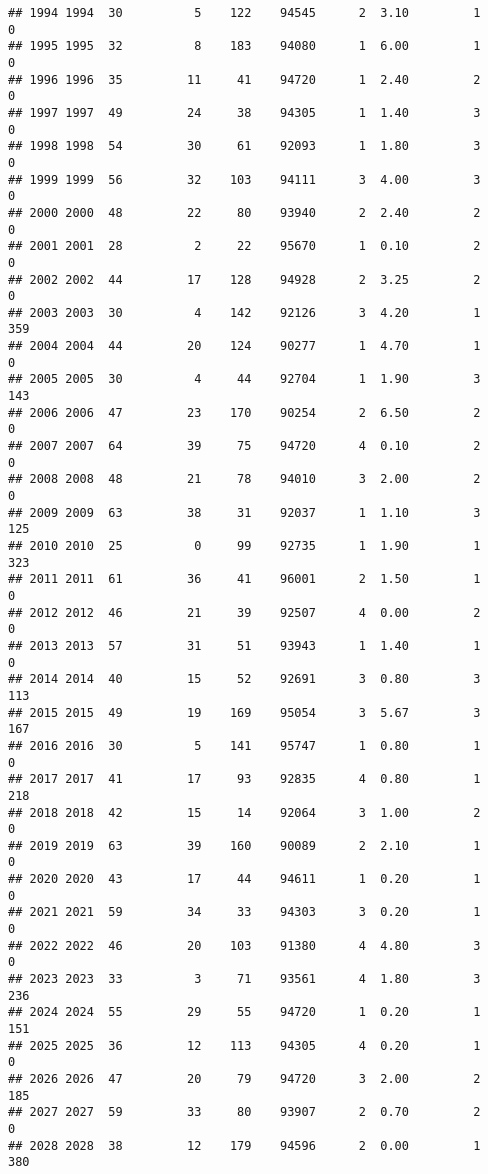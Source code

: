 \documentclass[
]{article}
\begin{document}
\begin{verbatim}
## 1994 1994  30          5    122    94545      2  3.10         1        0
## 1995 1995  32          8    183    94080      1  6.00         1        0
## 1996 1996  35         11     41    94720      1  2.40         2        0
## 1997 1997  49         24     38    94305      1  1.40         3        0
## 1998 1998  54         30     61    92093      1  1.80         3        0
## 1999 1999  56         32    103    94111      3  4.00         3        0
## 2000 2000  48         22     80    93940      2  2.40         2        0
## 2001 2001  28          2     22    95670      1  0.10         2        0
## 2002 2002  44         17    128    94928      2  3.25         2        0
## 2003 2003  30          4    142    92126      3  4.20         1      359
## 2004 2004  44         20    124    90277      1  4.70         1        0
## 2005 2005  30          4     44    92704      1  1.90         3      143
## 2006 2006  47         23    170    90254      2  6.50         2        0
## 2007 2007  64         39     75    94720      4  0.10         2        0
## 2008 2008  48         21     78    94010      3  2.00         2        0
## 2009 2009  63         38     31    92037      1  1.10         3      125
## 2010 2010  25          0     99    92735      1  1.90         1      323
## 2011 2011  61         36     41    96001      2  1.50         1        0
## 2012 2012  46         21     39    92507      4  0.00         2        0
## 2013 2013  57         31     51    93943      1  1.40         1        0
## 2014 2014  40         15     52    92691      3  0.80         3      113
## 2015 2015  49         19    169    95054      3  5.67         3      167
## 2016 2016  30          5    141    95747      1  0.80         1        0
## 2017 2017  41         17     93    92835      4  0.80         1      218
## 2018 2018  42         15     14    92064      3  1.00         2        0
## 2019 2019  63         39    160    90089      2  2.10         1        0
## 2020 2020  43         17     44    94611      1  0.20         1        0
## 2021 2021  59         34     33    94303      3  0.20         1        0
## 2022 2022  46         20    103    91380      4  4.80         3        0
## 2023 2023  33          3     71    93561      4  1.80         3      236
## 2024 2024  55         29     55    94720      1  0.20         1      151
## 2025 2025  36         12    113    94305      4  0.20         1        0
## 2026 2026  47         20     79    94720      3  2.00         2      185
## 2027 2027  59         33     80    93907      2  0.70         2        0
## 2028 2028  38         12    179    94596      2  0.00         1      380

\end{verbatim}
\end{document}
